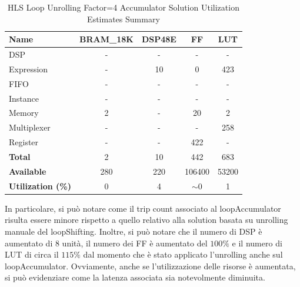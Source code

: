 \begin{table}[H]
	\centering
	\begin{tabular}{|l|c|c|c|c|}
		\hline
		\textbf{Name}    & \textbf{BRAM\_18K} & \textbf{DSP48E} & \textbf{FF} & \textbf{LUT} \\ \hline
		DSP              & -                   & -               & -           & -            \\ 
		Expression       & -                   & 10               & 0           & 423          \\ 
		FIFO             & -                   & -               & -           & -            \\ 
		Instance         & -                   & -               & -           & -            \\ 
		Memory           & 2                   & -               & 20          & 2            \\ 
		Multiplexer      & -                   & -               & -           & 258          \\ 
		Register         & -                   & -               & 422         & -            \\ \hline
		\textbf{Total}   & 2                   & 10               & 442         & 683          \\ \hline
		\textbf{Available} & 280               & 220             & 106400      & 53200        \\ \hline
		\textbf{Utilization (\%)} & 0            & 4              & $\sim$0     & 1     \\ \hline
	\end{tabular}
	\caption{HLS Loop Unrolling Factor=4 Accumulator Solution Utilization Estimates Summary}
	\label{tab:hls-loop-unrolling4-accumulator-solution-utilization-estimates-summary}
\end{table}

In particolare, si può notare come il trip count associato al loopAccumulator risulta essere minore rispetto a quello relativo alla solution basata su unrolling manuale del loopShifting. Inoltre, si può notare che il numero di DSP è aumentato di 8 unità, il numero dei FF è aumentato del $100\%$ e il numero di LUT di circa il $115\%$ dal momento che è stato applicato l'unrolling anche sul loopAccumulator. Ovviamente, anche se l'utilizzazione delle risorse è aumentata, si può evidenziare come la latenza associata sia notevolmente diminuita.